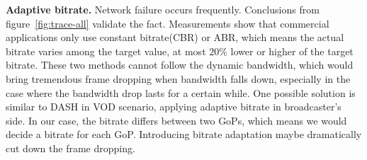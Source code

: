 \textbf{Adaptive bitrate.} Network failure occurs frequently. Conclusions from figure~\ref{fig:trace-all} validate the fact. Measurements show that commercial applications only use constant bitrate(CBR) or ABR, which means the actual bitrate varies among the target value, at most $20\%$ lower or higher of the target bitrate. These two methods cannot follow the dynamic bandwidth, which would bring tremendous frame dropping when bandwidth falls down, especially in the case where the bandwidth drop lasts for a certain while. One possible solution is similar to DASH in VOD scenario, applying adaptive bitrate in broadcaster's side. In our case, the bitrate differs between two GoPs, which means we would decide a bitrate for each GoP. Introducing bitrate adaptation maybe dramatically cut down the frame dropping.

\iffalse
\begin{itemize}
\item If we can relax the dependency between frames, the solution space would be larger and more optimal solutions are expected to be found. That is, we can relax the decodability constraints to be $d_i = 1, \forall i$.

\item We can relax queue length constraint, i.e., making $T_1$ larger. This change similarly increases the space of possible solutions.

\item The frame drop strategy can be improved. That is, compared with the naive strategy in OBS (dropping all P/B when exceeding a threshold), selectively choosing frames to drop in IP would give a more optimal solution.
\end{itemize}
\fi

